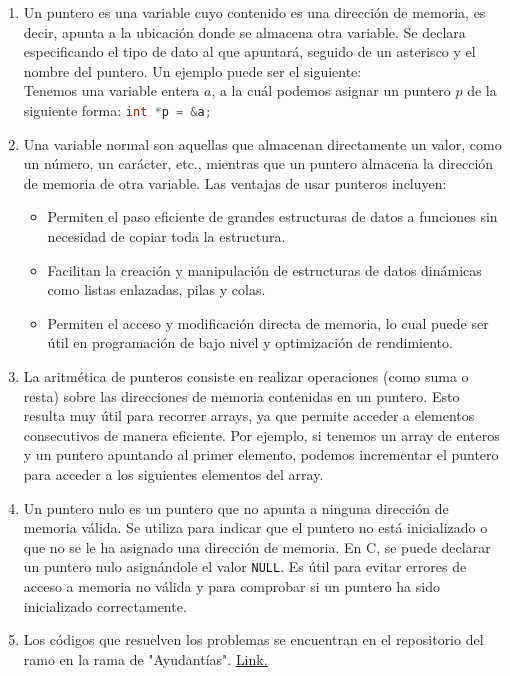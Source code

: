 \documentclass[12pt]{article}
\begin{document}
        \begin{enumerate}
            \item Un puntero es una variable cuyo contenido es una dirección de memoria, es decir, apunta a la ubicación donde se almacena otra variable. Se declara especificando el tipo de dato al que apuntará, seguido de un asterisco y el nombre del puntero. Un ejemplo puede ser el siguiente: \\
            Tenemos una variable entera $a$, a la cuál podemos asignar un puntero $p$ de la siguiente forma: \lstinline[language=C]|int *p = &a;|

            \item Una variable normal son aquellas que almacenan directamente un valor, como un número, un carácter, etc., mientras que un puntero almacena la dirección de memoria de otra variable. Las ventajas de usar punteros incluyen:
            \begin{itemize}
                \item Permiten el paso eficiente de grandes estructuras de datos a funciones sin necesidad de copiar toda la estructura.
                \item Facilitan la creación y manipulación de estructuras de datos dinámicas como listas enlazadas, pilas y colas.
                \item Permiten el acceso y modificación directa de memoria, lo cual puede ser útil en programación de bajo nivel y optimización de rendimiento.
            \end{itemize}

            \item La aritmética de punteros consiste en realizar operaciones (como suma o resta) sobre las direcciones de memoria contenidas en un puntero. Esto resulta muy útil para recorrer arrays, ya que permite acceder a elementos consecutivos de manera eficiente. Por ejemplo, si tenemos un array de enteros y un puntero apuntando al primer elemento, podemos incrementar el puntero para acceder a los siguientes elementos del array.
            
            \item Un puntero nulo es un puntero que no apunta a ninguna dirección de memoria válida. Se utiliza para indicar que el puntero no está inicializado o que no se le ha asignado una dirección de memoria. En C, se puede declarar un puntero nulo asignándole el valor \lstinline[language=C]|NULL|. Es útil para evitar errores de acceso a memoria no válida y para comprobar si un puntero ha sido inicializado correctamente.
            
            \item Los códigos que resuelven los problemas se encuentran en el repositorio del ramo en la rama de "Ayudantías". \href{https://github.com/otrab/EDA/tree/Ayudant%C3%ADas}{Link.}
        \end{enumerate}
\end{document}
